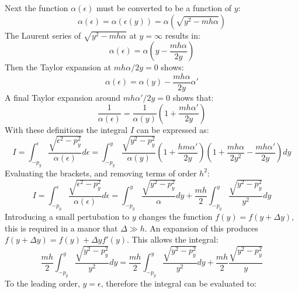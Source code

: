 		Next the function $\alpha\left(\epsilon\right)$ must be converted to be a function of $y$:
		\begin{equation}
			\alpha\left(\epsilon\right)=\alpha\left(\epsilon\left(y\right)\right)=\alpha\left(\sqrt{y^{2}-mh\alpha}\right)
		\end{equation}
		The Laurent series of $\sqrt{y^{2}-mh\alpha}$ at $y=\infty$ results in:
		\begin{equation}
			\alpha\left(\epsilon\right)=\alpha\left(y-\frac{mh\alpha}{2y}\right)
		\end{equation}
		Then the Taylor expansion at $mh\alpha / 2y=0$ shows:
		\begin{equation}
			\alpha\left(\epsilon\right)=\alpha\left(y\right)-\frac{mh\alpha}{2y}\alpha'
		\end{equation}
		A final Taylor expansion around $mh\alpha'/2y=0$ shows that:
		\begin{equation}
			\frac{1}{\alpha\left(\epsilon\right)}=\frac{1}{\alpha\left(y\right)}\left(1+\frac{mh\alpha'}{2y}\right)
		\end{equation}
		With these definitions the integral $I$ can be expressed as:
		\begin{equation}
			I=\int^{\epsilon}_{-p_{y}}\frac{\sqrt{\epsilon^{2}-p_{y}^{2}}}{\alpha\left(\epsilon\right)}d\epsilon=\int^{y}_{-p_{y}}\frac{\sqrt{y^{2}-p_{y}^{2}}}{\alpha\left(y\right)}\left(1+\frac{hm\alpha '}{2y}\right)\left(1+\frac{mh\alpha}{2y^{2}}-\frac{mh\alpha '}{2y}\right)dy
		\end{equation}
		Evaluating the brackets, and removing terms of order $h^{2}$:
		\begin{equation}
			I=\int^{\epsilon}_{-p_{y}}\frac{\sqrt{\epsilon^{2}-p_{y}^{2}}}{\alpha\left(\epsilon\right)}d\epsilon=\int^{y}_{-p_{y}}\frac{\sqrt{y^{2}-p_{y}^{2}}}{\alpha}dy+\frac{mh}{2}\int^{y}_{-p_{y}}\frac{\sqrt{y^{2}-p_{y}^{2}}}{y^{2}}dy
		\end{equation}
		Introducing a small pertubation to $y$ changes the function $f\left(y\right)=f\left(y+\Delta y\right)$, this is required in a manor that $\Delta \gg h$. An expansion of this produces $f\left(y+\Delta y\right)=f\left(y\right)+\Delta y f'\left(y\right)$. This allows the integral:
		\begin{equation}
			\frac{mh}{2}\int^{y}_{-p_{y}}\frac{\sqrt{y^{2}-p_{y}^{2}}}{y^{2}}dy=\frac{mh}{2}\int^{y}_{-p_{y}}\frac{\sqrt{y^{2}-p_{y}^{2}}}{y^{2}}dy+\frac{mh}{2}\frac{\sqrt{y^{2}-p_{y}^{2}}}{y}
		\end{equation}
		To the leading order, $y=\epsilon$, therefore the integral can be evaluated to:
